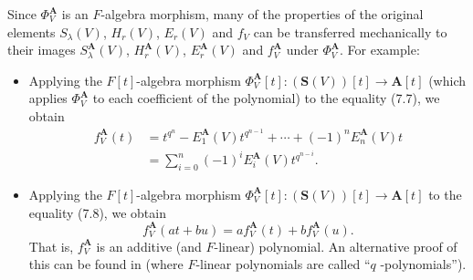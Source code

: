 \documentclass[numbers=enddot,12pt,final,onecolumn,notitlepage]{scrartcl}%
\theoremstyle{definition}
\let\sumnonlimits\sum
\renewcommand{\sum}{\sumnonlimits\limits}
\begin{document}
\begin{enumerate}
Since $\Phi_{V}^{\mathbf{A}}$ is an $F$-algebra morphism, many of the
properties of the original elements $S_{\lambda}\left(  V\right)  $,
$H_{r}\left(  V\right)  $, $E_{r}\left(  V\right)  $ and $f_{V}$ can be
transferred mechanically to their images $S_{\lambda}^{\mathbf{A}}\left(
V\right)  $, $H_{r}^{\mathbf{A}}\left(  V\right)  $, $E_{r}^{\mathbf{A}%
}\left(  V\right)  $ and $f_{V}^{\mathbf{A}}$ under $\Phi_{V}^{\mathbf{A}}$.
For example:

\begin{itemize}
\item Applying the $F\left[  t\right]  $-algebra morphism $\Phi_{V}%
^{\mathbf{A}}\left[  t\right]  :\left(  \mathbf{S}\left(  V\right)  \right)
\left[  t\right]  \rightarrow\mathbf{A}\left[  t\right]  $ (which applies
$\Phi_{V}^{\mathbf{A}}$ to each coefficient of the polynomial) to the equality
(7.7), we obtain%
\begin{align}
f_{V}^{\mathbf{A}}\left(  t\right)   &  =t^{q^{n}}-E_{1}^{\mathbf{A}}\left(
V\right)  t^{q^{n-1}}+\cdots+\left(  -1\right)  ^{n}E_{n}^{\mathbf{A}}\left(
V\right)  t\nonumber\\
&  =\sum_{i=0}^{n}\left(  -1\right)  ^{i}E_{i}^{\mathbf{A}}\left(  V\right)
t^{q^{n-i}}. \label{p26.7.7}%
\end{align}


\item Applying the $F\left[  t\right]  $-algebra morphism $\Phi_{V}%
^{\mathbf{A}}\left[  t\right]  :\left(  \mathbf{S}\left(  V\right)  \right)
\left[  t\right]  \rightarrow\mathbf{A}\left[  t\right]  $ to the equality
(7.8), we obtain%
\begin{equation}
f_{V}^{\mathbf{A}}\left(  at+bu\right)  =af_{V}^{\mathbf{A}}\left(  t\right)
+bf_{V}^{\mathbf{A}}\left(  u\right)  . \label{p26.7.8}%
\end{equation}
That is, $f_{V}^{\mathbf{A}}$ is an additive (and $F$-linear) polynomial. An
alternative proof of this can be found in \cite[Theorem 1.6]{ppoly} (where
$F$-linear polynomials are called \textquotedblleft$q$%
-polynomials\textquotedblright).


\end{itemize}
\end{enumerate}
\end{document}
